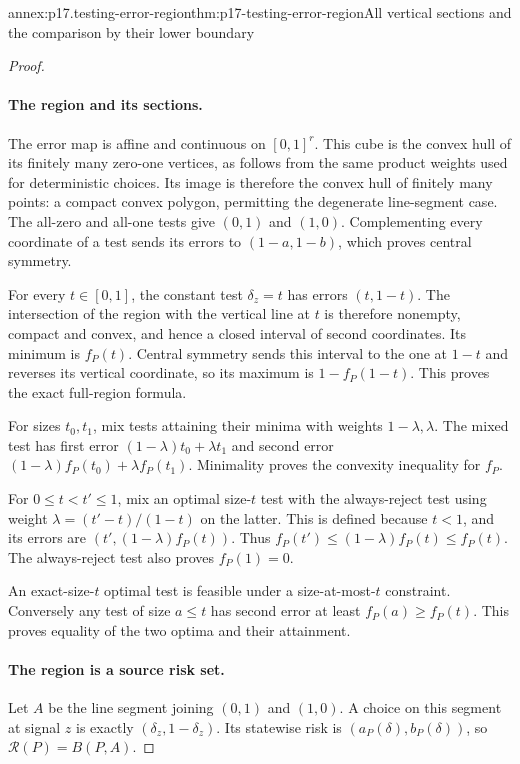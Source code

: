 \begin{annexitem}{annex:p17.testing-error-region}{thm:p17-testing-error-region}{All vertical sections and the comparison by their lower boundary}
\begin{proof}
\paragraph{The region and its sections.}
The error map is affine and continuous on \([0,1]^r\).
This cube is the convex hull of its finitely many zero-one vertices,
as follows from the same product weights used for deterministic choices.
Its image is therefore the convex hull of finitely many points: a compact
convex polygon, permitting the degenerate line-segment case.
The all-zero and all-one tests give \((0,1)\) and \((1,0)\).
Complementing every coordinate of a test sends its errors to
\((1-a,1-b)\), which proves central symmetry.

For every \(t\in[0,1]\), the constant test \(\delta_z=t\) has errors
\((t,1-t)\). The intersection of the region with the vertical line at
\(t\) is therefore nonempty, compact and convex, and hence a closed
interval of second coordinates. Its minimum is \(f_P(t)\).
Central symmetry sends this interval to the one at \(1-t\) and reverses
its vertical coordinate, so its maximum is \(1-f_P(1-t)\).
This proves the exact full-region formula.

For sizes \(t_0,t_1\), mix tests attaining their minima with weights
\(1-\lambda,\lambda\). The mixed test has first error
\((1-\lambda)t_0+\lambda t_1\) and second error
\((1-\lambda)f_P(t_0)+\lambda f_P(t_1)\).
Minimality proves the convexity inequality for \(f_P\).

For \(0\leq t<t'\leq1\), mix an optimal size-\(t\) test with the
always-reject test using weight \(\lambda=(t'-t)/(1-t)\) on the latter.
This is defined because \(t<1\), and its errors are
\((t',(1-\lambda)f_P(t))\).
Thus \(f_P(t')\leq(1-\lambda)f_P(t)\leq f_P(t)\).
The always-reject test also proves \(f_P(1)=0\).

An exact-size-\(t\) optimal test is feasible under a size-at-most-\(t\)
constraint. Conversely any test of size \(a\leq t\) has second error
at least \(f_P(a)\geq f_P(t)\). This proves equality of the two optima
and their attainment.

\paragraph{The region is a source risk set.}
Let \(A\) be the line segment joining \((0,1)\) and \((1,0)\).
A choice on this segment at signal \(z\) is exactly
\((\delta_z,1-\delta_z)\). Its statewise risk is
\((a_P(\delta),b_P(\delta))\), so \(\mathcal R(P)=B(P,A)\).


\end{proof}
\end{annexitem}
